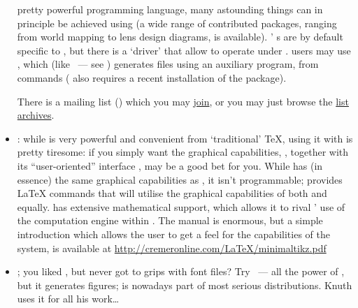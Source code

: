 \begin{itemize}
  pretty powerful programming language, many astounding things can in
  principle be achieved using  (a wide range of
  contributed packages, ranging from world mapping to lens design
  diagrams, is available).
  ' s are
  by default specific to , but there is
  a  `driver' that allow  to
  operate under \xetex{}.  \PDFTeX{} users may use ,
  which (like ~--- see %
  ) generates
   files using an auxiliary program, from 
  commands ( also requires a recent installation of
  the  package).

  There is a  mailing list
  () which you may
  \href{http://tug.org/mailman/listinfo/pstricks}{join}, or you may
  just browse the %
  \href{http://tug.org/pipermail/pstricks/}{list archives}.
\item {}: while  is very powerful and
  convenient from `traditional' \TeX{}, using it with \PDFLaTeX{} is
  pretty tiresome: if you 
  simply want the graphical capabilities, , together with
  its ``user-oriented'' interface , may be a good
  bet for you.  While  has (in essence) the same graphical
  capabilities as \PS{}, it isn't programmable;  provides
  \LaTeX{} commands that will utilise the graphical capabilities of
  both \PS{} and  equally.   has extensive
  mathematical support, which allows it to rival '
  use of the computation engine within \PS{}.
  The  manual is enormous, but a simple introduction which
  allows the user to get a feel for the capabilities of the system, is
  available at \url{http://cremeronline.com/LaTeX/minimaltikz.pdf}
\item \MP{}; you liked \MF{}, but never got to grips with font files?
  Try ~---
  all the power of \MF{}, but it generates \PS{} figures; \MP{}
  is nowadays part of most serious \AllTeX{} distributions.  Knuth
  uses it for all his work\dots{}


\end{itemize}
